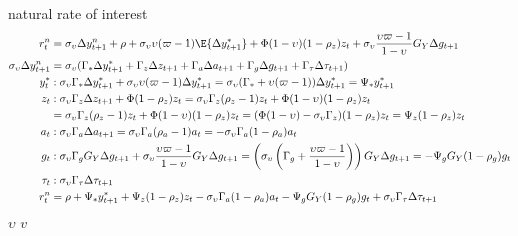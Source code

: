 \pagebreak
natural rate of interest
\begin{align}
    r^n_t  &= \sigma_\upsilon \Delta y^n_{t+1} + \rho + \sigma_\upsilon \upsilon (\varpi - 1)\E \{\Delta y_{t+1}^* \}  + \Phi (1-\upsilon)(1-\rho_z)z_t + \sigma_\upsilon \frac{\upsilon \varpi  - 1}{1-\upsilon} G_Y \Delta g_{t+1}\\
    \sigma_\upsilon \Delta y^n_{t+1} &= \sigma_\upsilon(\Gamma_* \Delta y^*_{t+1} + \Gamma_z \Delta z_{t+1} + \Gamma_a \Delta a_{t+1} + \Gamma_g \Delta g_{t+1} + \Gamma_\tau \Delta \tau_{t+1})\\
    y^*_t&: \sigma_\upsilon \Gamma_* \Delta y^*_{t+1} + \sigma_\upsilon \upsilon(\varpi-1)\Delta y^*_{t+1} = \sigma_\upsilon(\Gamma_* + \upsilon(\varpi-1))\Delta y^*_{t+1} = \Psi_* y^*_{t+1}\\
    z_t&: \sigma_\upsilon \Gamma_z \Delta z_{t+1} + \Phi (1-\rho_z)z_t = \sigma_\upsilon \Gamma_z (\rho_z - 1)z_t + \Phi (1-\upsilon)(1-\rho_z)z_t\\
    &= \sigma_\upsilon \Gamma_z (\rho_z - 1)z_t + \Phi (1-\upsilon)(1-\rho_z)z_t = (\Phi (1-\upsilon) - \sigma_\upsilon \Gamma_z)(1-\rho_z)z_t = \Psi_z (1-\rho_z) z_t\\
    a_t&: \sigma_\upsilon \Gamma_a \Delta a_{t+1} = \sigma_\upsilon \Gamma_a (\rho_a - 1)a_t = - \sigma_\upsilon \Gamma_a (1 - \rho_a)a_t\\
    g_t&: \sigma_\upsilon \Gamma_g G_Y \Delta g_{t+1} + \sigma_\upsilon \frac{\upsilon \varpi  - 1}{1-\upsilon} G_Y \Delta g_{t+1} = \left( \sigma_\upsilon \left(\Gamma_g + \frac{\upsilon \varpi  - 1}{1-\upsilon} \right) \right)G_Y \Delta g_{t+1} = -\Psi_g G_Y (1-\rho_g)g_t \\
    \tau_t&: \sigma_\upsilon \Gamma_\tau \Delta \tau_{t+1}\\
    r^n_t  &= \rho + \Psi_* y^*_{t+1} + \Psi_z (1-\rho_z) z_t - \sigma_\upsilon \Gamma_a (1 - \rho_a)a_t -\Psi_g G_Y (1-\rho_g)g_t + \sigma_\upsilon \Gamma_\tau \Delta \tau_{t+1}
\end{align}
$\upsilon$ $v$